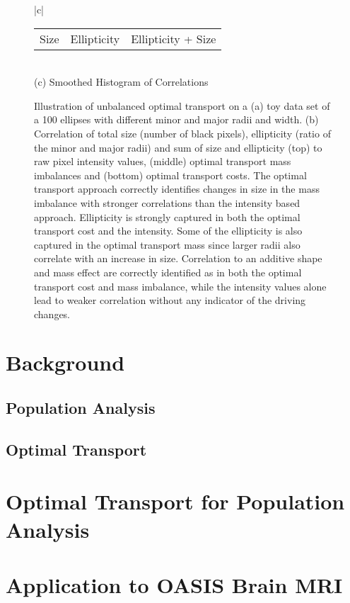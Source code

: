 \documentclass{llncs}
\begin{document}
\begin{figure}
\begin{tabular}{|c|}
\begin{tabular}{c|c|c}
        Size & Ellipticity & Ellipticity + Size
\end{tabular}\\
        (c) Smoothed Histogram of Correlations\\
        \hline
\end{tabular}
\caption{\label{fig:cor-ellipse}
Illustration of unbalanced optimal transport on a (a) toy data set of a 100
ellipses with different minor and major radii and width.  (b) Correlation
of total size (number of black pixels), ellipticity (ratio of the minor and major radii)
and sum of size and ellipticity (top) to raw pixel intensity values, (middle)
optimal transport mass imbalances and (bottom) optimal transport costs. The
optimal transport approach correctly identifies changes in size in the mass
imbalance with stronger correlations than the intensity based approach.
Ellipticity is strongly captured in both the optimal transport cost and
the intensity. Some of the ellipticity is also captured in the optimal
transport mass since larger radii also correlate with an increase in
size. Correlation to an additive shape and mass effect are correctly
identified as in both the optimal transport cost and mass imbalance,
while the intensity values alone lead to weaker correlation without any
indicator of the driving changes.   }
\end{figure}

\section{Background}

\subsection{Population Analysis}

\subsection{Optimal Transport}

\section{Optimal Transport for Population Analysis}

\section{Application to OASIS Brain MRI}
\end{document}
